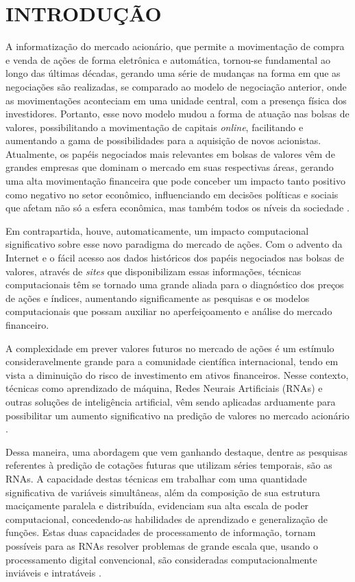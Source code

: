 
\chapter{INTRODUÇÃO}\label{ch:introducao}

A informatização do mercado acionário, que permite a movimentação de compra e venda de ações de forma eletrônica e automática, tornou-se fundamental ao longo das últimas décadas, gerando uma série de mudanças na forma em que as negociações são realizadas, se comparado ao modelo de negociação anterior, onde as movimentações aconteciam em uma unidade central, com a presença física dos investidores. Portanto, esse novo modelo mudou a forma de atuação nas bolsas de valores, possibilitando a movimentação de capitais \textit{online}, facilitando e aumentando a gama de possibilidades para a aquisição de novos acionistas. Atualmente, os papéis negociados mais relevantes em bolsas de valores vêm de grandes empresas que dominam o mercado em suas respectivas áreas, gerando uma alta movimentação financeira que pode conceber um impacto tanto positivo como negativo no setor econômico, influenciando em decisões políticas e sociais que afetam não só a esfera econômica, mas também todos os níveis da sociedade \cite{shiller}.

Em contrapartida, houve, automaticamente, um impacto computacional significativo sobre esse novo paradigma do mercado de ações. Com o advento da Internet e o fácil acesso aos dados históricos dos papéis negociados nas bolsas de valores, através de \textit{sites} que disponibilizam essas informações, técnicas computacionais têm se tornado uma grande aliada para o diagnóstico dos preços de ações e índices, aumentando significamente as pesquisas e os modelos computacionais que possam auxiliar no aperfeiçoamento e análise do mercado financeiro.

A complexidade em prever valores futuros no mercado de ações é um estímulo consideravelmente grande para a comunidade científica internacional, tendo em vista a diminuição do risco de investimento em ativos financeiros. Nesse contexto, técnicas como aprendizado de máquina, Redes Neurais Artificiais (RNAs) e outras soluções de inteligência artificial, vêm sendo aplicadas arduamente para possibilitar um aumento significativo na predição de valores no mercado acionário \cite{gambogi}.

Dessa maneira, uma abordagem que vem ganhando destaque, dentre as pesquisas referentes à predição de cotações futuras que utilizam séries temporais, são as RNAs. A capacidade destas técnicas em trabalhar com uma quantidade significativa de variáveis simultâneas, além da composição de sua estrutura maciçamente paralela e distribuída, evidenciam sua alta escala de poder computacional, concedendo-as habilidades de aprendizado e generalização de funções. Estas duas capacidades de processamento de informação, tornam possíveis para as RNAs resolver problemas de grande escala que, usando o processamento digital convencional, são consideradas computacionalmente inviáveis e intratáveis \cite{elpink, haykin2000}.

